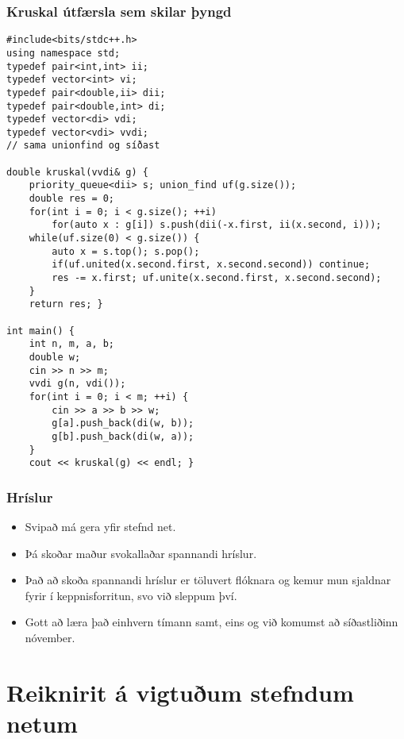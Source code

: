 \documentclass{beamer}
\begin{document}
\begin{frame}[fragile]
\frametitle{Kruskal útfærsla sem skilar þyngd}

\begin{tiny}
\begin{verbatim}
#include<bits/stdc++.h>
using namespace std;
typedef pair<int,int> ii;
typedef vector<int> vi;
typedef pair<double,ii> dii;
typedef pair<double,int> di;
typedef vector<di> vdi;
typedef vector<vdi> vvdi;
// sama unionfind og síðast

double kruskal(vvdi& g) {
    priority_queue<dii> s; union_find uf(g.size());
    double res = 0;
    for(int i = 0; i < g.size(); ++i)
        for(auto x : g[i]) s.push(dii(-x.first, ii(x.second, i)));
    while(uf.size(0) < g.size()) {
        auto x = s.top(); s.pop();
        if(uf.united(x.second.first, x.second.second)) continue;
        res -= x.first; uf.unite(x.second.first, x.second.second);
    }
    return res; }

int main() {
    int n, m, a, b;
    double w;
    cin >> n >> m;
    vvdi g(n, vdi());
    for(int i = 0; i < m; ++i) {
        cin >> a >> b >> w;
        g[a].push_back(di(w, b));
        g[b].push_back(di(w, a));
    }
    cout << kruskal(g) << endl; }
\end{verbatim}
\end{tiny}

\end{frame}

\begin{frame}
\frametitle{Hríslur}

\begin{itemize}

\item<1-> Svipað má gera yfir stefnd net.

\item<2-> Þá skoðar maður svokallaðar spannandi hríslur.

\item<3-> Það að skoða spannandi hríslur er töluvert flóknara og kemur mun sjaldnar fyrir í keppnisforritun, svo við sleppum því.

\item<4-> Gott að læra það einhvern tímann samt, eins og við komumst að síðastliðinn nóvember.

\end{itemize}

\end{frame}

\section[Reiknirit á vigtuðum stefndum netum]{Reiknirit á vigtuðum stefndum netum}
\end{document}
